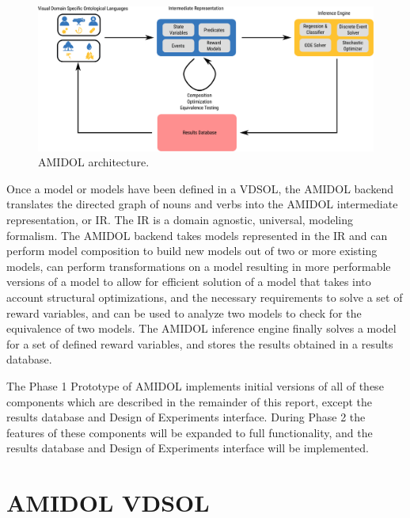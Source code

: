 \documentclass[11pt]{article}
\newcommand{\amidol}{\textsc{AMIDOL}}
\begin{document}
\begin{figure}
  \includegraphics[width=\textwidth]{figs/system-architecture.pdf}
  \caption{\amidol{} architecture.}
  \label{Fig:AMIDOLArch}
\end{figure}

Once a model or models have been defined in a VDSOL, the \amidol{} backend translates the directed graph of nouns and verbs into the \amidol{} intermediate representation, or IR.  The IR is a domain agnostic, universal, modeling formalism.  The \amidol{} backend takes models represented in the IR and can perform model composition to build new models out of two or more existing models, can perform transformations on a model resulting in more performable versions of a model to allow for efficient solution of a model that takes into account structural optimizations, and the necessary requirements to solve a set of reward variables, and can be used to analyze two models to check for the equivalence of two models. The \amidol{} inference engine finally solves a model for a set of defined reward variables, and stores the results obtained in a results database.

The Phase 1 Prototype of \amidol{} implements initial versions of all of these components which are described in the remainder of this report, except the results database and Design of Experiments interface.  During Phase 2 the features of these components will be expanded to full functionality, and the results database and Design of Experiments interface will be implemented.

\section{\amidol{} VDSOL}
\end{document}
